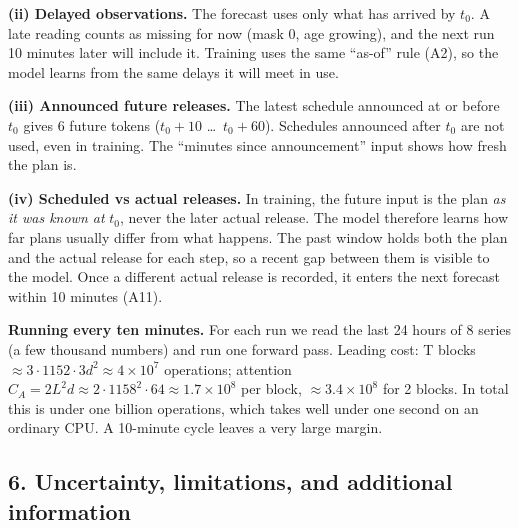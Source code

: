 \documentclass[11pt,a4paper]{article}
\begin{document}
\textbf{(ii) Delayed observations.} The forecast uses only what has arrived by $t_0$. A late reading counts as missing for now (mask 0, age growing), and the next run 10 minutes later will include it. Training uses the same ``as-of'' rule (A2), so the model learns from the same delays it will meet in use.

\textbf{(iii) Announced future releases.} The latest schedule announced at or before $t_0$ gives 6 future tokens ($t_0+10$ \dots\ $t_0+60$). Schedules announced after $t_0$ are not used, even in training. The ``minutes since announcement'' input shows how fresh the plan is.

\textbf{(iv) Scheduled vs actual releases.} In training, the future input is the plan \emph{as it was known at} $t_0$, never the later actual release. The model therefore learns how far plans usually differ from what happens. The past window holds both the plan and the actual release for each step, so a recent gap between them is visible to the model. Once a different actual release is recorded, it enters the next forecast within 10 minutes (A11).

\textbf{Running every ten minutes.} For each run we read the last 24 hours of 8 series (a few thousand numbers) and run one forward pass. Leading cost: T blocks $\approx 3\cdot 1152 \cdot 3d^2 \approx 4\times 10^7$ operations; attention $C_A = 2L^2 d \approx 2 \cdot 1158^2 \cdot 64 \approx 1.7\times 10^8$ per block, $\approx 3.4\times 10^8$ for 2 blocks. In total this is under one billion operations, which takes well under one second on an ordinary CPU. A 10-minute cycle leaves a very large margin.

\subsection*{6. Uncertainty, limitations, and additional information}
\end{document}
